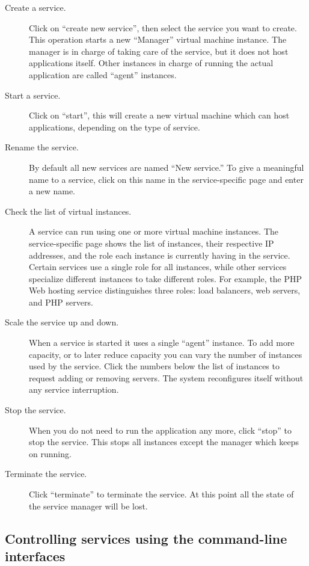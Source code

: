 \documentclass[10pt]{article}
\begin{document}
\begin{description}
\item[Create a service.] Click on ``create new service'', then select
  the service you want to create. This operation starts a new
  ``Manager'' virtual machine instance. The manager is in charge of
  taking care of the service, but it does not host applications
  itself. Other instances in charge of running the actual application
  are called ``agent'' instances.
\item[Start a service.] Click on ``start'', this will create a new
  virtual machine which can host applications, depending on the type
  of service.
\item[Rename the service.] By default all new services are named ``New
  service.'' To give a meaningful name to a service, click on this
  name in the service-specific page and enter a new name.
\item[Check the list of virtual instances.] A service can run using
  one or more virtual machine instances. The service-specific page
  shows the list of instances, their respective IP addresses, and the
  role each instance is currently having in the service. Certain
  services use a single role for all instances, while other services
  specialize different instances to take different roles. For example,
  the PHP Web hosting service distinguishes three roles: load
  balancers, web servers, and PHP servers.
\item[Scale the service up and down.] When a service is started it
  uses a single ``agent'' instance. To add more capacity, or to later
  reduce capacity you can vary the number of instances used by the
  service. Click the numbers below the list of instances to request
  adding or removing servers. The system reconfigures itself without
  any service interruption.
\item[Stop the service.] When you do not need to run the application
  any more, click ``stop'' to stop the service. This stops all
  instances except the manager which keeps on running. 
\item[Terminate the service.] Click ``terminate'' to terminate the
  service. At this point all the state of the service manager will be
  lost.
\end{description}

\subsection{Controlling services using the command-line interfaces}
\end{document}
